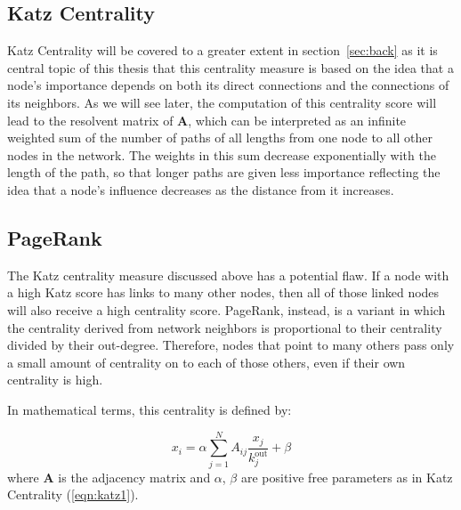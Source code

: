 
\subsection*{Katz Centrality}
Katz Centrality will be covered to a greater extent in section~\ref{sec:back} as it is  central topic of this thesis that this centrality measure is based on the idea that a node's importance depends on both its direct connections and the connections of its neighbors. As we will see later, the computation of this centrality score will lead to the resolvent matrix of $\mathbf{A}$, which can be interpreted as an infinite weighted sum of the number of paths of all lengths from one node to all other nodes in the network. The weights in this sum decrease exponentially with the length of the path, so that longer paths are given less importance reflecting the idea that a node's influence decreases as the distance from it increases. 


\subsection*{PageRank}

The Katz centrality measure discussed above has a potential flaw. If a node with a high Katz score has links to many other nodes, then all of those linked nodes will also receive a high centrality score. PageRank, instead, is a variant in which the centrality derived from network neighbors is proportional to their centrality divided by their out-degree. Therefore, nodes that point to many others pass only a small amount of centrality on to each of those others, even if their own centrality is high.

In mathematical terms, this centrality is defined by:

\begin{equation}
\label{eqn:pr1}
    x_i= \alpha\sum_{j=1}^{N}A_{ij}\frac{x_j}{k_j^{\text{out}}} + \beta
\end{equation}
where $\mathbf{A}$ is the adjacency matrix and $\alpha$, $\beta$ are positive free parameters as in Katz Centrality (\ref{eqn:katz1}). 

